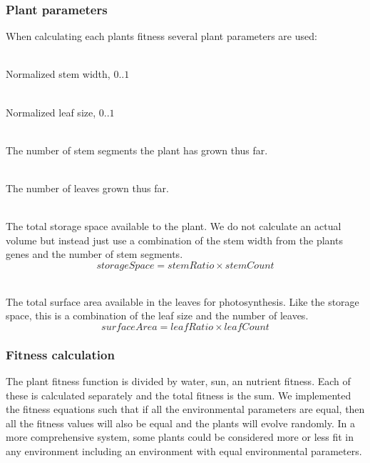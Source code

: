 \documentclass[conference]{acmsiggraph}
\begin{document}
\subsubsection{Plant parameters}

When calculating each plants fitness several plant parameters are used:

\begin{description}[leftmargin=!,labelindent=0.2in,labelwidth=0.1in]
  \item[Stem ratio]    \hfill \\
    Normalized stem width, $0 .. 1$
  \item[Leaf ratio]    \hfill \\
    Normalized leaf size, $0 .. 1$
  \item[Stem count]    \hfill \\
    The number of stem segments the plant has grown thus far.
  \item[Leaf count]    \hfill \\
    The number of leaves grown thus far.
  \item[Storage space] \hfill \\
    The total storage space available to the plant. We do not calculate an
    actual volume but instead just use a combination of the stem width from the
    plants genes and the number of stem segments.
    \[ storageSpace = stemRatio \times stemCount \]
  \item[Surface area]  \hfill \\
    The total surface area available in the leaves for photosynthesis. Like the
    storage space, this is a combination of the leaf size and the number of
    leaves.
    \[ surfaceArea = leafRatio \times leafCount \]
\end{description}

\subsubsection{Fitness calculation}

The plant fitness function is divided by water, sun, an nutrient fitness. Each
of these is calculated separately and the total fitness is the sum. We
implemented the fitness equations such that if all the environmental parameters
are equal, then all the fitness values will also be equal and the plants will
evolve randomly. In a more comprehensive system, some plants could be considered
more or less fit in any environment including an environment with equal
environmental parameters.
\end{document}
